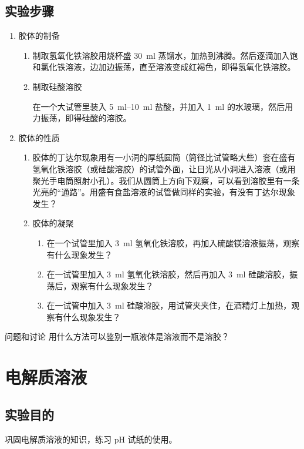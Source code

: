 \subsection*{实验步骤}
\begin{enumerate}[1.]
  \item 胶体的制备
  \begin{enumerate}[(1)]
    \item 制取氢氧化铁溶胶\quad 用烧杯盛 \qty{30}{ml} 蒸馏水，加热到沸腾。然后逐滴加入饱和氯化铁溶液，边加边振荡，直至溶液变成红褐色，即得氢氧化铁溶胶。
    \item 制取硅酸溶胶
    
    在一个大试管里装入 \qtyrange{5}{10}{ml} 盐酸，并加入 \qty{1}{ml} 的水玻璃，然后用力振荡，即得硅酸的溶胶。
  \end{enumerate}
  \item 胶体的性质
  \begin{enumerate}[(1)]
    \item 胶体的丁达尔现象\quad 用有一小洞的厚纸圆筒（筒径比试管略大些）套在盛有氢氧化铁溶胶（或硅酸溶胶）的试管外面，让日光从小洞进入溶液（或用聚光手电筒照射小孔）。我们从圆筒上方向下观察，可以看到溶胶里有一条光亮的“通路”。用盛有食盐溶液的试管做同样的实验，有没有丁达尔现象发生？
    \item 胶体的凝聚
    \begin{enumerate}[label=\protect\cnum{\arabic*}]
      \item 在一个试管里加入 \qty{3}{ml} 氢氧化铁溶胶，再加入硫酸镁溶液振荡，观察有什么现象发生？
      \item 在一试管里加入 \qty{3}{ml} 氢氧化铁溶胶，然后再加入 \qty{3}{ml} 硅酸溶胶，振荡后，观察有什么现象发生？
      \item 在一试管中加入 \qty{3}{ml} 硅酸溶胶，用试管夹夹住，在酒精灯上加热，观察有什么现象发生？
    \end{enumerate}
  \end{enumerate}
\end{enumerate}
\begin{Theorem}{问题和讨论}
用什么方法可以鉴别一瓶液体是溶液而不是溶胶？
\end{Theorem}


\section{电解质溶液}
\subsection*{实验目的}
巩固电解质溶液的知识，练习 pH 试纸的使用。

